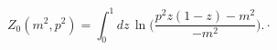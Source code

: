 \begin{equation}
Z_{0}(m^{2},p^{2})=\int_{0}^{1}dz\,\ln \Big(\frac{p^{2}z(1-z)-m^{2}}{-m^{2}}%
\Big).\cdot   \label{6}
\end{equation}

